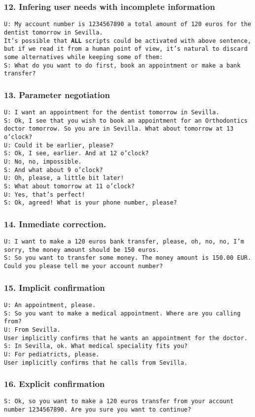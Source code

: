 \documentclass[11pt]{beamer}
\newcommand{\system}[1]{{\color{red}\texttt{S: #1}}\\}
\newcommand{\user}[1]{{\color{teal}\texttt{U: #1}}\\}
\newcommand{\comment}[1]{{\color{orange}\texttt{#1}}\\}
\begin{document}
\begin{frame}
\frametitle{12. Infering user needs with incomplete information}
\user{My account number is 1234567890 a total amount of 120 euros for the dentist tomorrow in Sevilla.}
\vspace{10pt}
\comment{It's possible that \textbf{ALL} scripts could be activated with above sentence, but if we read it from a human point of view, it's natural to discard some alternatives while keeping some of them:}
\vspace{10pt}
\system{What do you want to do first, book an appointment or make a bank transfer?}
\end{frame}

\begin{frame}
\frametitle{13. Parameter negotiation}
\user{I want an appointment for the dentist tomorrow in Sevilla.}
\system{Ok, I see that you wish to book an appointment for an Orthodontics doctor tomorrow. So you are in Sevilla. What about tomorrow at 13 o'clock?}
\user{Could it be earlier, please?}
\system{Ok, I see, earlier. And at 12 o'clock?}
\user{No, no, impossible.}
\system{And what about 9 o'clock?}
\user{Oh, please, a little bit later!}
\system{What about tomorrow at 11 o'clock?}
\user{Yes, that's perfect!}
\system{Ok, agreed! What is your phone number, please?}
\end{frame}

\begin{frame}
\frametitle{14. Inmediate correction.}
\user{I want to make a 120 euros bank transfer, please, oh, no, no, I'm sorry, the money amount should be 150 euros.}
\system{So you want to transfer some money. The money amount is 150.00 EUR. Could you please tell me your account number?}
\end{frame}

\begin{frame}
\frametitle{15. Implicit confirmation}
\user{An appointment, please.}
\system{So you want to make a medical appointment. Where are you calling from?}
\user{From Sevilla.}
\vspace{10pt}
\comment{User implicitly confirms that he wants an appointment for the doctor.}
\vspace{10pt}
\system{In Sevilla, ok. What medical speciality fits you?}
\user{For pediatricts, please.}
\vspace{10pt}
\comment{User implicitly confirms that he calls from Sevilla.}
\end{frame}

\begin{frame}
\frametitle{16. Explicit confirmation}
\system{Ok, so you want to make a 120 euros transfer from your account number 1234567890. Are you sure you want to continue?}
\end{frame}
\end{document}
